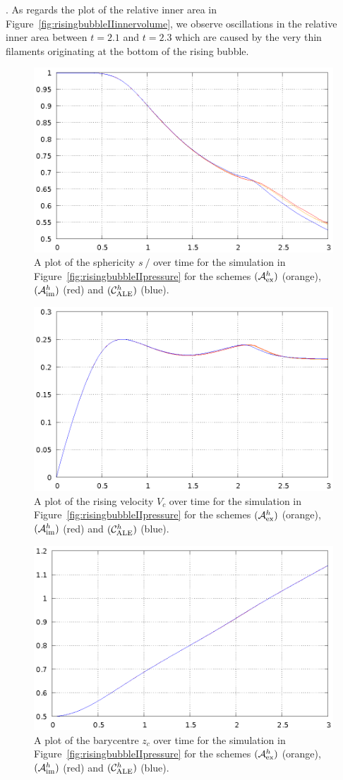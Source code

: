 \documentclass[a4paper,12pt,onecolumn]{article}
\newcommand{\strikes}{\mbox{$s\!\!\!\!\:/$}}
\newcommand{\schemeAex}{{\mathcal{A}^h_{\rm ex}}}
\newcommand{\schemeAim}{{\mathcal{A}^h_{\rm im}}}
\newcommand{\schemeALE}{{\mathcal{C}^h_{\rm ALE}}}
\begin{document}
\cite{HysingTKPBGT09}. As regards the plot of the relative inner area
in Figure~\ref{fig:risingbubbleIIinnervolume}, we observe oscillations in
the relative inner area between $t=2.1$ and $t=2.3$ which are caused by
the very thin filaments originating at the bottom of the rising bubble.
\begin{figure}[htbp]
\centering
\includegraphics[width=.45\textwidth]
{figures/rising_bubble_II_sphericity.ps}
\caption{A plot of the sphericity $\strikes$ over time for the simulation in
Figure~\ref{fig:risingbubbleIIpressure} for the schemes $(\schemeAex)$
(orange), $(\schemeAim)$ (red) and $(\schemeALE)$ (blue).}
\label{fig:risingbubbleIIsphericity}
\end{figure}%
\begin{figure}[htbp]
\centering
\includegraphics[width=.45\textwidth]
{figures/rising_bubble_II_rising_velocity.ps}
\caption{A plot of the rising velocity $V_c$ over time for the simulation in
Figure~\ref{fig:risingbubbleIIpressure} for the schemes $(\schemeAex)$
(orange), $(\schemeAim)$ (red) and $(\schemeALE)$ (blue).}
\label{fig:risingbubbleIIrisingvelocity}
\end{figure}%
\begin{figure}[htbp]
\centering
\includegraphics[width=.45\textwidth]
{figures/rising_bubble_II_barycenter.ps}
\caption{A plot of the barycentre $z_c$ over time for the simulation in
Figure~\ref{fig:risingbubbleIIpressure} for the schemes $(\schemeAex)$
(orange), $(\schemeAim)$ (red) and $(\schemeALE)$ (blue).}
\label{fig:risingbubbleIIbarycenter}
\end{figure}%
\end{document}
